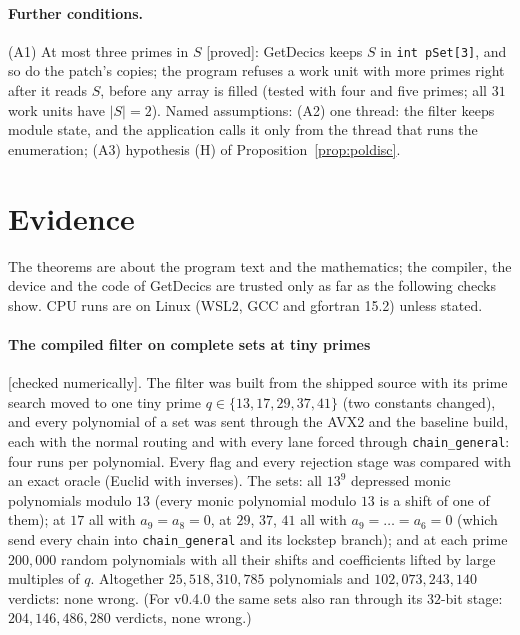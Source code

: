 \documentclass[10pt,a4paper]{article}
\newcommand{\code}[1]{\texttt{#1}}
\newcommand{\stproved}{\textsf{\small[proved]}\xspace}
\newcommand{\stnum}{\textsf{\small[checked numerically]}\xspace}
\theoremstyle{plain}
\theoremstyle{definition}
\begin{document}
\paragraph{Further conditions.}  (A1) At most three primes in $S$ \stproved: GetDecics keeps $S$ in \code{int pSet[3]}, and so do the patch's copies; the program refuses a
work unit with more primes right after it reads $S$, before any array is filled (tested with four and five primes; all $31$ work units have $|S|=2$).  Named
assumptions: (A2) one thread: the filter keeps module state, and the application calls it only from the thread that runs the enumeration; (A3) hypothesis (H) of
Proposition~\ref{prop:poldisc}.

\section{Evidence}\label{sec:evidence}

The theorems are about the program text and the mathematics; the compiler, the device and the code of GetDecics are trusted only as far as the following checks
show.  CPU runs are on Linux (WSL2, GCC and gfortran 15.2) unless stated.

\paragraph{The compiled filter on complete sets at tiny primes} \stnum.  The filter was built from the shipped source with its prime search moved to one tiny prime
$q\in\{13,17,29,37,41\}$ (two constants changed), and every polynomial of a set was sent through the AVX2 and the baseline build, each with the normal routing and
with every lane forced through \code{chain\_general}: four runs per polynomial.  Every flag and every rejection stage was
compared with an exact oracle (Euclid with inverses).  The sets: all $13^9$ depressed monic polynomials modulo $13$ (every monic polynomial modulo $13$ is a shift of one
of them); at $17$ all with $a_9=a_8=0$, at $29$, $37$, $41$ all with $a_9=\dots=a_6=0$ (which send every chain into \code{chain\_general} and its lockstep branch); and at
each prime $200{,}000$ random polynomials with all their shifts and coefficients lifted by large multiples of $q$.  Altogether $25{,}518{,}310{,}785$ polynomials and
$102{,}073{,}243{,}140$ verdicts: none wrong.  (For v0.4.0 the same sets also ran through its $32$-bit stage: $204{,}146{,}486{,}280$ verdicts, none wrong.)
\end{document}
